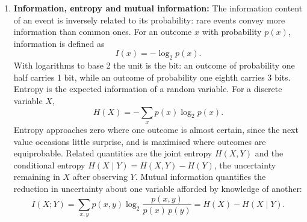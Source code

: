 \documentclass[conference]{IEEEtran}
\begin{document}
\begin{enumerate}
    \item \textbf{Information, entropy and mutual information:} The information content of an event is inversely related to its probability: rare events convey more information than common ones. For an outcome $x$ with probability $p(x)$, information is defined as
    \begin{equation}
        I(x) = -\log_2 p(x).
    \end{equation}
    With logarithms to base 2 the unit is the bit: an outcome of probability one half carries 1 bit, while an outcome of probability one eighth carries 3 bits. Entropy is the expected information of a random variable. For a discrete variable $X$,
    \begin{equation}
        H(X) = -\sum_x p(x) \log_2 p(x).
    \end{equation}
    Entropy approaches zero where one outcome is almost certain, since the next value occasions little surprise, and is maximised where outcomes are equiprobable. Related quantities are the joint entropy $H(X, Y)$ and the conditional entropy $H(X \mid Y) = H(X, Y) - H(Y)$, the uncertainty remaining in $X$ after observing $Y$. Mutual information quantifies the reduction in uncertainty about one variable afforded by knowledge of another:
    \begin{equation}
        I(X; Y) = \sum_{x, y} p(x, y) \log_2 \frac{p(x, y)}{p(x)\, p(y)} = H(X) - H(X \mid Y).
    \end{equation}

\end{enumerate}
\end{document}
